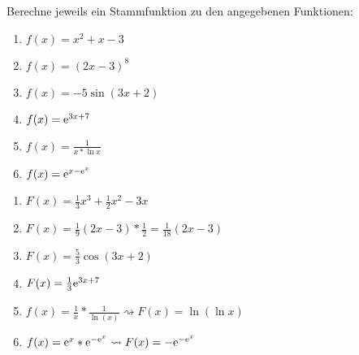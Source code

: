 


 Berechne jeweils ein Stammfunktion zu den angegebenen Funktionen:
\begin{multicols}{3}
	\begin{enumerate}
		\item $f(x)=x^2+x-3$
		\item $f(x)=(2x-3)^8$
		\item $f(x)=-5\sin(3x+2)$
		\item $f(x)=\mathrm{e}^{3x+7}$
		\item $f(x)=\frac{1}{x*\ln x}$
		\item $f(x)=\mathrm{e}^{x-\mathrm{e}^x}$
	\end{enumerate}
\end{multicols}
\begin{lsg}{}
	\begin{multicols}{2}
		\begin{enumerate}
			\item $F(x)=\frac 1 3x^3+\frac 1 2 x^2-3x$
			\item $F(x)=\frac 1 9 (2x-3)*\frac 1 2=\frac{1}{18}(2x-3)$
			\item $F(x)=\frac 5 3 \cos(3x+2)$
			\item $F(x)=\frac 1 3 \mathrm{e}^{3x+7}$
			\item $f(x)=\frac 1 x*\frac{1}{\ln(x)}\rightsquigarrow F(x)=\ln(\ln x)$
			\item $f(x)=\mathrm{e}^x*\mathrm{e}^{-\mathrm{e}^x}\rightsquigarrow F(x)=-\mathrm{e}^{-\mathrm{e}^x}$
		\end{enumerate}
	\end{multicols}
\end{lsg}





